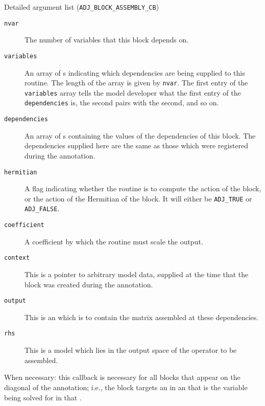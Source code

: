 \begin{boxwithtitle}{Detailed argument list (\texttt{ADJ_BLOCK_ASSEMBLY_CB})}
\begin{description}
\item[\texttt{nvar}] The number of variables that this block depends on.
\item[\texttt{variables}] An array of s indicating which dependencies are being supplied to this routine. The length of the
array is given by \texttt{nvar}. The first entry of the \texttt{variables} array
tells the model developer what the first entry of the \texttt{dependencies} is, the second pairs with the second, and so on.
\item[\texttt{dependencies}] An array of s containing the values of the dependencies of this block. The dependencies supplied
here are the same as those which were registered during the annotation.
\item[\texttt{hermitian}] A flag indicating whether the routine is to compute the action of the block, or the action of the Hermitian of the
block. It will either be \texttt{ADJ_TRUE} or \texttt{ADJ_FALSE}.
\item[\texttt{coefficient}] A coefficient by which the routine must scale the output.
\item[\texttt{context}] This is a pointer to arbitrary model data, supplied at the time that the block was created during the annotation.
\item[\texttt{output}] This is an  which is to contain the matrix assembled at these dependencies.
\item[\texttt{rhs}] This is a model  which lies in the output space of the operator to be assembled. 
\end{description}
\end{boxwithtitle}

When necessary: this callback is necessary for all blocks that appear on the diagonal of the annotation; i.e., the block
targets an  in an  that is the variable being solved for in that
.

